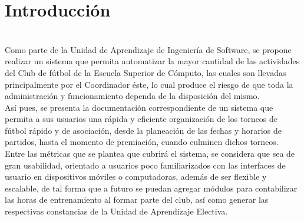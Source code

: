 \section{Introducción}

\begin{description}
	\\Como parte de la Unidad de Aprendizaje de Ingeniería de Software, se propone realizar un sistema que permita automatizar la mayor cantidad de las actividades del Club de fútbol de la Escuela Superior de Cómputo, las cuales son llevadas principalmente por el Coordinador éste, lo cual produce el riesgo de que toda la administración y funcionamiento dependa de la disposición del mismo.\\
	
Así pues, se presenta la documentación correspondiente de un sistema que permita a sus usuarios una rápida y eficiente organización de los torneos de fútbol rápido y de asociación, desde la planeación de las fechas y horarios de partidos, hasta el momento de premiación, cuando culminen dichos torneos.\\

Entre las métricas que se plantea que cubrirá el sistema, se considera que sea de gran usabilidad, orientado a usuarios poco familiarizados con las interfaces de usuario en dispositivos móviles o computadoras, además de ser flexible y escalable, de tal forma que a futuro se puedan agregar módulos para contabilizar las horas de entrenamiento al formar parte del club, así como generar las respectivas constancias de la Unidad de Aprendizaje Electiva.

\end{description}

